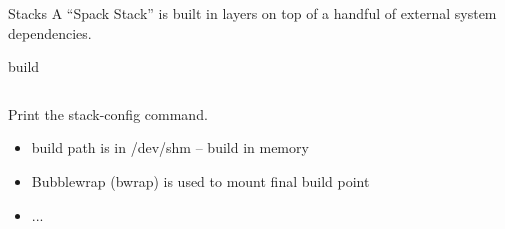 \documentclass[aspectratio=43]{beamer}
\begin{document}
\begin{frame}[fragile]{Stacks}
    A ``Spack Stack'' is built in layers on top of a handful of external system dependencies.
    \begin{center}
        
    \end{center}
\end{frame}

\begin{frame}[fragile]{build}
    \begin{columns}[T]
        \begin{column}{0.5\textwidth}
            Print the stack-config command.

            \begin{itemize}
                \item build path is in /dev/shm -- build in memory
                \item Bubblewrap (bwrap) is used to mount final build point
                \item ...
            \end{itemize}
        \end{column}
        \begin{column}{0.5\textwidth}
            {
            \setlength{\DTbaselineskip}{5pt}
            
            }
        \end{column}
    \end{columns}
\end{frame}
\end{document}
